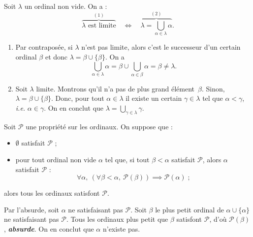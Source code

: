 \documentclass[./main]{subfiles}
\begin{document}
  \begin{prop}
    Soit $\lambda$ un ordinal non vide. On a :
    \[
      \overbrace{\lambda \text{ est limite}}^{(1)} \quad \iff \quad \overbrace{\lambda = \bigcup_{\alpha \in \lambda} \alpha}^{(2)}
    .\] 
  \end{prop}
  \begin{prv}
    \begin{enumerate}
      \item Par contraposée, si $\lambda$ n'est pas limite, alors c'est le successeur d'un certain ordinal $\beta$ et donc $\lambda = \beta \cup \{\beta\}$.
        On a \[
        \bigcup_{\alpha \in \lambda} \alpha = \beta \cup \bigcup_{\alpha \in \beta} \alpha = \beta \neq \lambda
        .\] 
      \item Soit $\lambda$ limite.
        Montrons qu'il n'a pas de plus grand élément~$\beta$.
        Sinon, $\lambda = \beta \cup \{\beta\}$.
        Donc, pour tout $\alpha \in \lambda$ il existe un certain $\gamma \in \lambda$ tel que $\alpha < \gamma$,  \textit{i.e.} $\alpha \in \gamma$.
        On en conclut que $\lambda = \bigcup_{\gamma \in \lambda} \gamma$.
    \end{enumerate}
  \end{prv}

  \begin{thm}
    Soit $\mathcal{P}$ une propriété sur les ordinaux.
    On suppose que :
    \begin{itemize}
      \item $\emptyset$ satisfait $\mathcal{P}$ ;
      \item pour tout ordinal non vide $\alpha$ tel que, si tout $\beta < \alpha$ satisfait $\mathcal{P}$, alors $\alpha$ satisfait $\mathcal{P}$ :
        \[
        \forall \alpha, \: (\forall \beta < \alpha, \: \mathcal{P}(\beta)) \implies \mathcal{P}(\alpha) \;
        ;\] 
    \end{itemize}
    alors tous les ordinaux satisfont $\mathcal{P}$.
  \end{thm}
  \begin{prv}
    Par l'absurde, soit $\alpha$ ne satisfaisant pas $\mathcal{P}$.
    Soit $\beta$ le plus petit ordinal de $\alpha \cup \{\alpha\}$ ne satisfaisant pas $\mathcal{P}$.
    Tous les ordinaux plus petit que $\beta$ satisfont $\mathcal{P}$, d'où $\mathcal{P}(\beta)$, \textit{\textbf{absurde}}.
    On en conclut que $\alpha$ n'existe pas.
  \end{prv}
\end{document}
